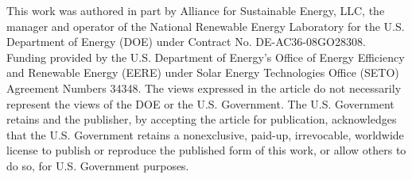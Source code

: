 \documentclass[conference]{IEEEtran}
\begin{document}
This work was authored in part by Alliance for Sustainable Energy, LLC, the manager and operator of the National Renewable Energy Laboratory for the U.S. Department of Energy (DOE) under Contract No. DE-AC36-08GO28308. Funding provided by the U.S. Department of Energy’s Office of Energy Efficiency and Renewable Energy (EERE) under Solar Energy Technologies Office (SETO) Agreement Numbers 34348. The views expressed in the article do not necessarily represent the views of the DOE or the U.S. Government. The U.S. Government retains and the publisher, by accepting the article for publication, acknowledges that the U.S. Government retains a nonexclusive, paid-up, irrevocable, worldwide license to publish or reproduce the published form of this work, or allow others to do so, for U.S. Government purposes.



\end{document}
